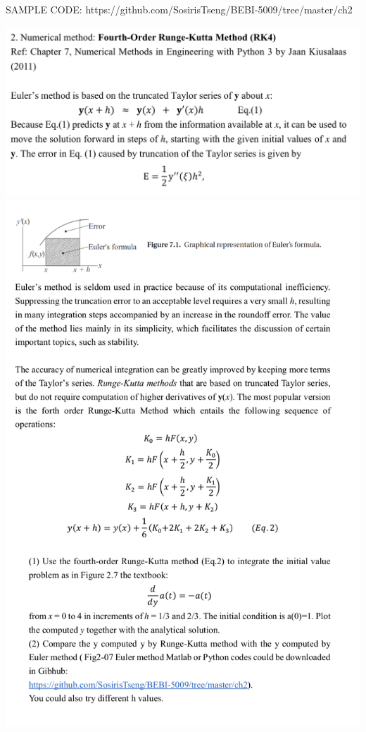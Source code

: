 \documentclass[11pt]{article}
\makeatletter
\def\maxwidth{\ifdim\Gin@nat@width>\linewidth\linewidth
    \else\Gin@nat@width\fi}
\let\Oldincludegraphics\includegraphics
\renewcommand{\includegraphics}[1]{\Oldincludegraphics[width=.8\maxwidth]{#1}}
\makeatother
\begin{document}
SAMPLE CODE: https://github.com/SosirisTseng/BEBI-5009/tree/master/ch2

    \includegraphics{img/p2-1-RK4.png} \includegraphics{img/p2-2-RK4.png}
\end{document}
